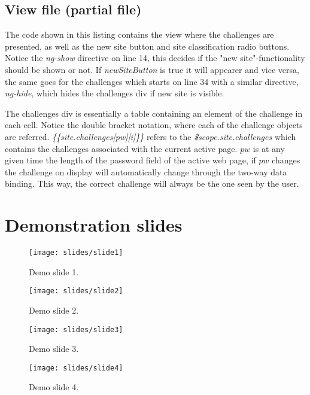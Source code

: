 \section{View file (partial file)}\label{app:view}

The code shown in this listing contains the view where the challenges are presented, as well as the new site button and site classification radio buttons. Notice the \emph{ng-show} directive on line 14, this decides if the "new site"-functionality should be shown or not. If \emph{newSiteButton} is true it will appearer and vice versa, the same goes for the challenges which starts on line 34 with a similar directive, \emph{ng-hide}, which hides the challenges div if new site is visible.  
\par The challenges div is essentially a table containing an element of the challenge in each cell. Notice the double bracket notation, where each of the challenge objects are referred. \emph{\{\{site.challenges[pw][i]\}\}} refers to the \emph{\$scope.site.challenges} which contains the challenges associated with the current active page. $pw$ is at any given time the length of the password field of the active web page, if $pw$ changes the challenge on display will automatically change through the two-way data binding. This way, the correct challenge will always be the one seen by the user.


\chapter{Demonstration slides}\label{demo-slides}

\begin{figure}
    \texttt{[image: slides/slide1]}
    \caption{Demo slide 1.}
    \label{slide1}
\end{figure}


\begin{figure}
    \texttt{[image: slides/slide2]}
    \caption{Demo slide 2.}
    \label{slide2}
\end{figure}


\begin{figure}
    \texttt{[image: slides/slide3]}
    \caption{Demo slide 3.}
    \label{slide3}
\end{figure}


\begin{figure}
    \texttt{[image: slides/slide4]}
    \caption{Demo slide 4.}
    \label{slide4}
\end{figure}

